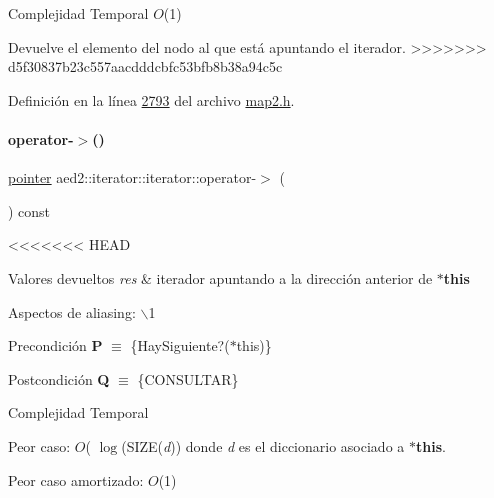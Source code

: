 \begin{DoxyDescription}
\item[Complejidad Temporal]$O$(1)
\end{DoxyDescription}

Devuelve el elemento del nodo al que está apuntando el iterador. 
>>>>>>> d5f30837b23c557aacdddcbfc53bfb8b38a94c5c

Definición en la línea \hyperlink{map2_8h_source_l02793}{2793} del archivo \hyperlink{map2_8h_source}{map2.\+h}.

\mbox{\label{classaed2_1_1iterator_1_1iterator_a9e9f5ca8d13a6945d6520736c0cc1a4f_a9e9f5ca8d13a6945d6520736c0cc1a4f}} 
\paragraph{\texorpdfstring{operator-\/$>$()}{operator->()}}
{\footnotesize\ttfamily \hyperlink{classaed2_1_1iterator_1_1iterator_add8c8243f6b0e3cb7b67ce06757df53b_add8c8243f6b0e3cb7b67ce06757df53b}{pointer} aed2\+::iterator\+::iterator\+::operator-\/$>$ (\begin{DoxyParamCaption}{ }\end{DoxyParamCaption}) const\hspace{0.3cm}{\ttfamily [inline]}}


<<<<<<< HEAD
\begin{DoxyRetVals}{\-Valores devueltos}
{\em res} & iterador apuntando a la dirección anterior de {\bfseries $\ast$this}\\
\hline
\end{DoxyRetVals}
\begin{DoxyParagraph}{\-Aspectos de aliasing\-:}
$\backslash$1
\end{DoxyParagraph}
\begin{DoxyPrecond}{\-Precondición}
{\bfseries \-P} $\equiv$ \{\-Hay\-Siguiente?($\ast$this)\} 
\end{DoxyPrecond}
\begin{DoxyPostcond}{\-Postcondición}
{\bfseries \-Q} $\equiv$ \{\-C\-O\-N\-S\-U\-L\-T\-A\-R\}
\end{DoxyPostcond}

\begin{DoxyDescription}
\item[\-Complejidad \-Temporal]
\begin{DoxyItemize}
\item \-Peor caso\-: $O$( $\log$(\-S\-I\-Z\-E({\itshape d\/})) donde {\itshape d\/} es el diccionario asociado a {\bfseries $\ast$this}.
\item \-Peor caso amortizado\-: $O$(1) 
\end{DoxyItemize}
\end{DoxyDescription}

